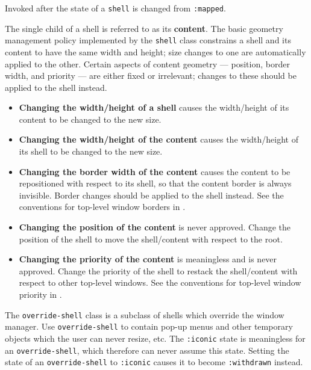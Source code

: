 \documentclass[twoside]{book}
\begin{document}
\begin{sloppy}
\begin{flushright} \parbox[t]{6.125in}{
Invoked after the state of a {\tt shell} is changed from {\tt :mapped}.

}\end{flushright}


The single child of a shell is referred to as its {\bf content}. The basic geometry management policy implemented by the {\tt shell}
class constrains a shell and its content to have the same width and height;
size changes to one are automatically applied to the other. Certain aspects of
content geometry --- position, border width, and priority --- are either fixed
or irrelevant; changes to these should be applied to the shell instead.
        
\begin{itemize}
\item {\bf Changing the width/height of a shell} causes the width/height of its
content to be changed to the new size.

\item {\bf Changing the width/height of the content} causes the width/height of its
shell to be changed to the new size.

\item {\bf Changing the border width of the content} causes the content to be
repositioned with respect to its shell, so that the content border is always
invisible. Border changes should be applied to the shell instead. See the
conventions for top-level window borders in \cite{icccm}.

\item {\bf Changing the position of the content} is never approved. Change the
position of the shell to move the shell/content with respect to the root.

\item {\bf Changing the priority of the content} is meaningless and is never
approved. Change the priority of the shell to restack the shell/content with
respect to other top-level windows. See the conventions for top-level window
priority in \cite{icccm}.

\end{itemize}


The {\tt override-shell} class is a subclass of shells which override the window
manager. Use {\tt override-shell} to contain pop-up menus and other temporary
objects which the user can never resize, etc. The {\tt :iconic} state is
meaningless for an {\tt override-shell}, which therefore can never assume this
state. Setting the state of an {\tt override-shell} to {\tt :iconic} causes it
to become {\tt :withdrawn} instead.


\end{sloppy}
\end{document}
